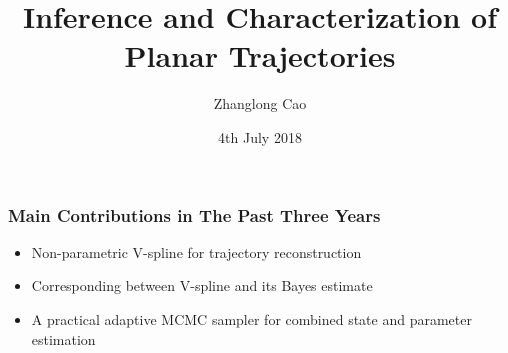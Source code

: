 \documentclass{beamer}
\title[]{Inference and Characterization of Planar Trajectories} %
\author{Zhanglong Cao} %
\institute[UO] %
{
Department of Maths \& Stats  \\
University of Otago %
}
\date{4th July 2018} %
\begin{document}
\begin{frame}
\titlepage %
\end{frame}




\begin{frame}
\frametitle{Main Contributions in The Past Three Years}
\begin{itemize}
	\item Non-parametric V-spline for trajectory reconstruction
	\item Corresponding between V-spline and its Bayes estimate
	\item A practical adaptive MCMC sampler for combined state and parameter estimation
\end{itemize}

\end{frame}
\end{document}
